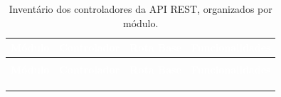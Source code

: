 \begin{center}
{\footnotesize
{}
\begin{xltabular}{\textwidth}{|>{\raggedright\arraybackslash}p{2cm}|>{\raggedright\arraybackslash}p{4cm}|>{\raggedright\arraybackslash}p{3.7cm}|>{\raggedright\arraybackslash}X|}
\hline
{}\textcolor{white}{\textbf{Módulo}} & \textcolor{white}{\textbf{Controlador}} & \textcolor{white}{\textbf{Rota Base}} & \textcolor{white}{\textbf{Funcionalidades}} \\ \hline
\endfirsthead

 \\
\hline
{}\textcolor{white}{\textbf{Módulo}} & \textcolor{white}{\textbf{Controlador}} & \textcolor{white}{\textbf{Rota Base}} & \textcolor{white}{\textbf{Funcionalidades}} \\ \hline
\endhead

\hline {} \\ \hline \endfoot

\hline
\caption{Inventário dos controladores da API REST, organizados por módulo.}
\label{tab:controladores} \\
\endlastfoot


\end{xltabular}}
\end{center}
